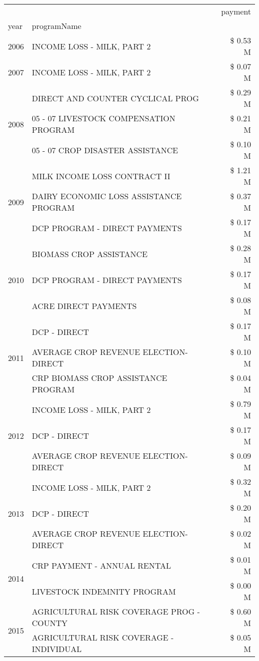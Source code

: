 \begin{tabular}{llr}
\toprule
 &  & payment \\
year & programName &  \\
\midrule
2006 & INCOME LOSS - MILK, PART 2 & \$ 0.53 M \\
\cline{1-3}
2007 & INCOME LOSS - MILK, PART 2 & \$ 0.07 M \\
\cline{1-3}
\multirow[t]{3}{*}{2008} & DIRECT AND COUNTER CYCLICAL PROG & \$ 0.29 M \\
 & 05 - 07 LIVESTOCK COMPENSATION PROGRAM & \$ 0.21 M \\
 & 05 - 07 CROP DISASTER ASSISTANCE & \$ 0.10 M \\
\cline{1-3}
\multirow[t]{3}{*}{2009} & MILK INCOME LOSS CONTRACT II & \$ 1.21 M \\
 & DAIRY ECONOMIC LOSS ASSISTANCE PROGRAM & \$ 0.37 M \\
 & DCP PROGRAM - DIRECT PAYMENTS & \$ 0.17 M \\
\cline{1-3}
\multirow[t]{3}{*}{2010} & BIOMASS CROP ASSISTANCE & \$ 0.28 M \\
 & DCP PROGRAM - DIRECT PAYMENTS & \$ 0.17 M \\
 & ACRE DIRECT PAYMENTS & \$ 0.08 M \\
\cline{1-3}
\multirow[t]{3}{*}{2011} & DCP - DIRECT & \$ 0.17 M \\
 & AVERAGE CROP REVENUE ELECTION-DIRECT & \$ 0.10 M \\
 & CRP BIOMASS CROP ASSISTANCE PROGRAM & \$ 0.04 M \\
\cline{1-3}
\multirow[t]{3}{*}{2012} & INCOME LOSS - MILK, PART 2 & \$ 0.79 M \\
 & DCP - DIRECT & \$ 0.17 M \\
 & AVERAGE CROP REVENUE ELECTION-DIRECT & \$ 0.09 M \\
\cline{1-3}
\multirow[t]{3}{*}{2013} & INCOME LOSS - MILK, PART 2 & \$ 0.32 M \\
 & DCP - DIRECT & \$ 0.20 M \\
 & AVERAGE CROP REVENUE ELECTION-DIRECT & \$ 0.02 M \\
\cline{1-3}
\multirow[t]{2}{*}{2014} & CRP PAYMENT - ANNUAL RENTAL & \$ 0.01 M \\
 & LIVESTOCK INDEMNITY PROGRAM & \$ 0.00 M \\
\cline{1-3}
\multirow[t]{3}{*}{2015} & AGRICULTURAL RISK COVERAGE PROG - COUNTY & \$ 0.60 M \\
 & AGRICULTURAL RISK COVERAGE - INDIVIDUAL & \$ 0.05 M \\

\end{tabular}
